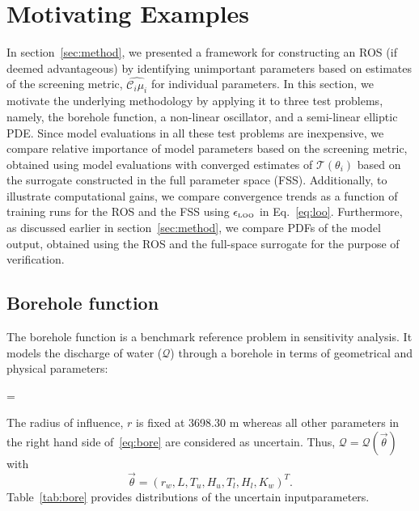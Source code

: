 \section{Motivating Examples}
\label{sec:examples}

In section~\ref{sec:method}, we presented a framework for constructing
an ROS (if deemed advantageous) by identifying unimportant parameters based on 
estimates of the screening metric, $\widehat{\mathcal{C}_i\mu_i}$
for individual parameters.
In this section, we motivate the underlying methodology by applying it to three test problems,
namely, the borehole function, a non-linear oscillator, and a semi-linear elliptic PDE.
Since model evaluations in all these test
problems are inexpensive, we compare relative importance of model parameters based
on the screening metric, obtained using model evaluations with 
converged estimates of $\mathcal{T}(\theta_i)$ based on the surrogate constructed in the
full parameter space (FSS). Additionally, to illustrate computational gains, we compare
convergence trends as a function of training runs for the ROS and the FSS using 
$\epsilon_{\mbox{\tiny LOO}}$ in Eq.~\ref{eq:loo}. 
Furthermore, as discussed earlier in section~\ref{sec:method}, we compare
PDFs of the model output, obtained using the ROS and the full-space surrogate for
the purpose of verification. 

\subsection{Borehole function}

The borehole function is a benchmark reference problem in sensitivity analysis. It models the discharge
of water ($\mathcal{Q}$) through a borehole in terms of geometrical and physical parameters:

\be
{} = 
\label{eq:bore}
\ee

\noindent The radius of influence, $r$ is fixed at 3698.30 m whereas all other parameters
in the right hand side of~\eqref{eq:bore} are considered 
as uncertain. Thus, $\mathcal{Q} = \mathcal{Q}(\vec{\theta})$ with 
\[
   \vec{\theta} = (r_w, L, T_u, H_u, T_l, H_l, K_w)^T.
\] 
Table~\ref{tab:bore} provides distributions of the uncertain inputparameters. 

